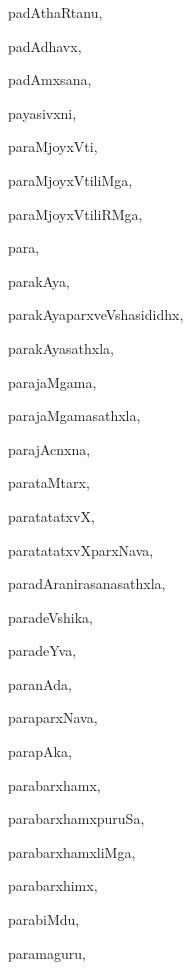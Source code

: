 \begin{multicols}{3}
{\noindent
{padAthaRtanu}, \pageref{padAthaRtanu}

\noindent
{padAdhavx}, \pageref{padAdhavx}

\noindent
{padAmxsana}, \pageref{padAmxsana}

\noindent
{payasivxni}, \pageref{payasivxni}

\noindent
{paraMjoyxVti}, \pageref{paraMjoyxVti}

\noindent
{paraMjoyxVtiliMga}, \pageref{paraMjoyxVtiliMga}

\noindent
{paraMjoyxVtiliRMga}, \pageref{paraMjoyxVtiliRMga}

\noindent
{para}, \pageref{para}

\noindent
{parakAya}, \pageref{parakAya}

\noindent
{parakAyaparxveVshasididhx}, \pageref{parakAyaparxveVshasididhx}

\noindent
{parakAyasathxla}, \pageref{parakAyasathxla}

\noindent
{parajaMgama}, \pageref{parajaMgama}

\noindent
{parajaMgamasathxla}, \pageref{parajaMgamasathxla}

\noindent
{parajAcnxna}, \pageref{parajAcnxna}

\noindent
{parataMtarx}, \pageref{parataMtarx}

\noindent
{paratatatxvX}, \pageref{paratatatxvX}

\noindent
{paratatatxvXparxNava}, \pageref{paratatatxvXparxNava}

\noindent
{paradAranirasanasathxla}, \pageref{paradAranirasanasathxla}

\noindent
{paradeVshika}, \pageref{paradeVshika}

\noindent
{paradeYva}, \pageref{paradeYva}

\noindent
{paranAda}, \pageref{paranAda}

\noindent
{paraparxNava}, \pageref{paraparxNava}

\noindent
{parapAka}, \pageref{parapAka}

\noindent
{parabarxhamx}, \pageref{parabarxhamx}

\noindent
{parabarxhamxpuruSa}, \pageref{parabarxhamxpuruSa}

\noindent
{parabarxhamxliMga}, \pageref{parabarxhamxliMga}

\noindent
{parabarxhimx}, \pageref{parabarxhimx}

\noindent
{parabiMdu}, \pageref{parabiMdu}

\noindent
{paramaguru}, \pageref{paramaguru}

}
\end{multicols}
